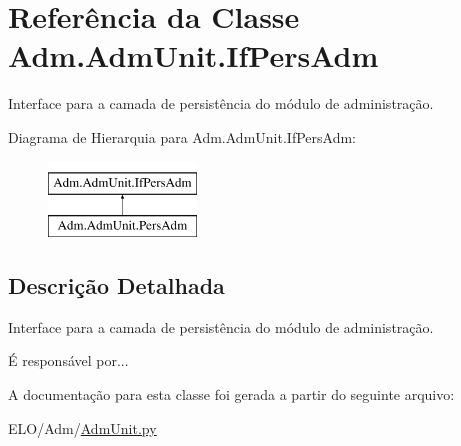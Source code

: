 \hypertarget{classAdm_1_1AdmUnit_1_1IfPersAdm}{\section{Referência da Classe Adm.\-Adm\-Unit.\-If\-Pers\-Adm}
\label{classAdm_1_1AdmUnit_1_1IfPersAdm}
}


Interface para a camada de persistência do módulo de administração.  


Diagrama de Hierarquia para Adm.\-Adm\-Unit.\-If\-Pers\-Adm\-:\begin{figure}[H]
\begin{center}
\leavevmode
\includegraphics[height=2.000000cm]{d0/dce/classAdm_1_1AdmUnit_1_1IfPersAdm}
\end{center}
\end{figure}


\subsection{Descrição Detalhada}
Interface para a camada de persistência do módulo de administração. 

É responsável por... 

A documentação para esta classe foi gerada a partir do seguinte arquivo\-:\begin{DoxyCompactItemize}
\item 
E\-L\-O/\-Adm/\hyperlink{AdmUnit_8py}{Adm\-Unit.\-py}\end{DoxyCompactItemize}
